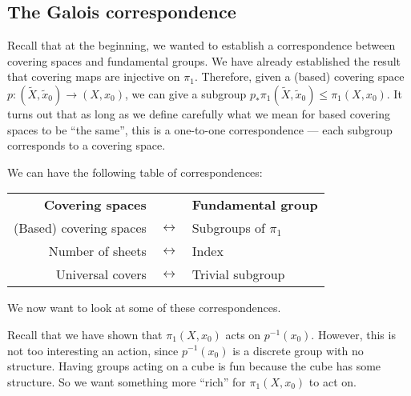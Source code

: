 \documentclass[a4paper]{article}
\begin{document}
\subsection{The Galois correspondence}
Recall that at the beginning, we wanted to establish a correspondence between covering spaces and fundamental groups. We have already established the result that covering maps are injective on $\pi_1$. Therefore, given a (based) covering space $p: (\tilde{X}, \tilde{x}_0) \to (X, x_0)$, we can give a subgroup $p_*\pi_1(\tilde{X}, \tilde{x}_0)\leq \pi_1(X, x_0)$. It turns out that as long as we define carefully what we mean for based covering spaces to be ``the same'', this is a one-to-one correspondence --- each subgroup corresponds to a covering space.

We can have the following table of correspondences:
\begin{center}
  \begin{tabular}{rcl}
    \textbf{Covering spaces} & & \textbf{Fundamental group}\\
    (Based) covering spaces & $\longleftrightarrow$ & Subgroups of $\pi_1$\\
    Number of sheets & $\longleftrightarrow$ & Index\\
    Universal covers & $\longleftrightarrow$ & Trivial subgroup\\
  \end{tabular}
\end{center}
We now want to look at some of these correspondences.

Recall that we have shown that $\pi_1(X, x_0)$ acts on $p^{-1}(x_0)$. However, this is not too interesting an action, since $p^{-1}(x_0)$ is a discrete group with no structure. Having groups acting on a cube is fun because the cube has some structure. So we want something more ``rich'' for $\pi_1(X, x_0)$ to act on.
\end{document}
